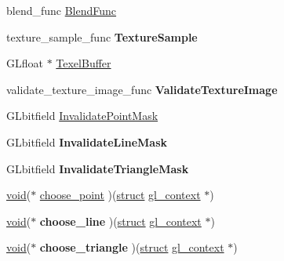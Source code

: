 \begin{DoxyCompactItemize}
\item 
blend\+\_\+func \hyperlink{struct_s_wcontext_ad06b09a06a642e3009043b80227f68ba}{Blend\+Func}
\item 
\mbox{\label{struct_s_wcontext_aceab65f003d5183e66e76a17afbbeb6e}} 
texture\+\_\+sample\+\_\+func {\bfseries Texture\+Sample}
\item 
G\+Lfloat $\ast$ \hyperlink{struct_s_wcontext_acc5960e550aca2f44f43be2b111506d0}{Texel\+Buffer}
\item 
\mbox{\label{struct_s_wcontext_abc0f1b3eba3d358876eb41561b7edc63}} 
validate\+\_\+texture\+\_\+image\+\_\+func {\bfseries Validate\+Texture\+Image}
\end{DoxyCompactItemize}
\textbf{ }\par
\begin{DoxyCompactItemize}
\item 
G\+Lbitfield \hyperlink{struct_s_wcontext_ad1c8f5179f8a2433441f63e99461979c}{Invalidate\+Point\+Mask}
\item 
\mbox{\label{struct_s_wcontext_af82d7ae44567563f5ddd63cb0540c3dd}} 
G\+Lbitfield {\bfseries Invalidate\+Line\+Mask}
\item 
\mbox{\label{struct_s_wcontext_a9138e0d622dec6cd16daf356d97db4bd}} 
G\+Lbitfield {\bfseries Invalidate\+Triangle\+Mask}
\end{DoxyCompactItemize}

\textbf{ }\par
\begin{DoxyCompactItemize}
\item 
\hyperlink{interfacevoid}{void}($\ast$ \hyperlink{struct_s_wcontext_a818d839abeda8d1525e472383c3278f7}{choose\+\_\+point} )(\hyperlink{interfacestruct}{struct} \hyperlink{structgl__context}{gl\+\_\+context} $\ast$)
\item 
\mbox{\label{struct_s_wcontext_ada0d4f7d44bfda80559294afa4b5ac33}} 
\hyperlink{interfacevoid}{void}($\ast$ {\bfseries choose\+\_\+line} )(\hyperlink{interfacestruct}{struct} \hyperlink{structgl__context}{gl\+\_\+context} $\ast$)
\item 
\mbox{\label{struct_s_wcontext_a154abdd9a5db6b236435d20d4cb6407c}} 
\hyperlink{interfacevoid}{void}($\ast$ {\bfseries choose\+\_\+triangle} )(\hyperlink{interfacestruct}{struct} \hyperlink{structgl__context}{gl\+\_\+context} $\ast$)
\end{DoxyCompactItemize}

